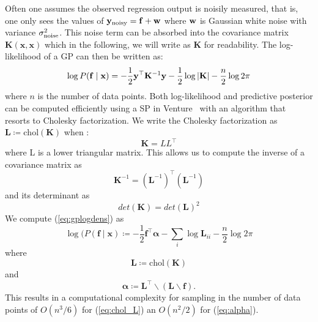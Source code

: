 Often one assumes the observed regression output is noisily measured, that is, one only sees the values of $\mathbf{y}_{\textrm{noisy}} = \mathbf{f}+ \mathbf{w}$ where $\mathbf{w}$ is Gaussian white noise with variance $\sigma_{\textrm{noise}}^2$. This noise term can be absorbed into the covariance matrix $\mathbf{K}(\mathbf{x},\mathbf{x})$ which in the following, we will write as $\mathbf{K}$ for readability. The log-likelihood of a \ac{GP} can then be written as:
\begin{equation}
\label{eq:gplogdens}
\log P(\mathbf{f} \mid \mathbf{x}) =
-\frac12 \mathbf{y}^\top 
\mathbf{K}^{-1} \mathbf{y}
- \frac12\log \left\lvert \mathbf{K} \right\rvert
- \frac{n}{2}\log 2\pi
\end{equation}
where $n$ is the number of data points.
Both log-likelihood and predictive posterior can be computed efficiently using a \ac{SP} in Venture~\citep{mansinghka2014venture}
with an algorithm that resorts to Cholesky factorization\citep[chap. 2]{rasmussen2006gaussian}. 
We write the Cholesky factorization as 
$\mathbf{L} \coloneqq \text{chol}(\mathbf{K})$ when
:
\begin{equation}
\mathbf{K} = LL^\top
\end{equation}
where L is a lower triangular matrix. This allows us to compute the inverse of a covariance matrix as
\begin{equation}
\mathbf{K}^{-1} = (\mathbf{L}^{-1})^\top (\mathbf{L}^{-1})
\end{equation}
and its determinant as 
\begin{equation}
det(\mathbf{K}) = det(\mathbf{L})^2
\end{equation}
We compute (\ref{eq:gplogdens}) as
\begin{equation}
\log(P(\mathbf{f}\mid \mathbf{x})\coloneqq - \frac{1}{2} \mathbf{f}^\top \bm{\alpha} - \sum_i \log \mathbf{L}_{ii} - \frac{n}{2} \log 2 \pi
\end{equation}
where 
\begin{equation}
\label{eq:chol_L}
\mathbf{L} \coloneqq \text{chol}(\mathbf{K})
\end{equation}
and 
\begin{equation}
\label{eq:alpha}
\bm{\alpha} \coloneqq  \mathbf{L}^\top \backslash(\mathbf{L} \backslash \mathbf{f}). 
\end{equation}
This results in a computational complexity for sampling in the number of data points of $O(n^3/6)$ for (\ref{eq:chol_L}) an $O(n^2/2)$ for (\ref{eq:alpha}). 

